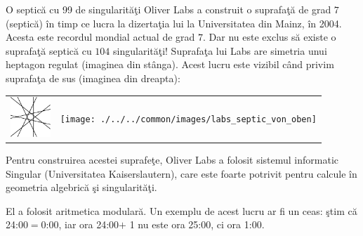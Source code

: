 \begin{surferPage}{O septic\u{a} cu 99 de singularit\u{a}\c{t}i}
     Oliver Labs a construit o suprafa\c{t}\u{a} de grad $7$ (septic\u{a}) \^{i}n timp ce lucra la
    dizerta\c{t}ia lui la Universitatea din Mainz, \^{i}n 2004. Acesta este recordul mondial actual
    de grad $7$. Dar nu este exclus s\u{a} existe o suprafa\c{t}\u{a} septic\u{a} cu $104$ singularit\u{a}\c{t}i!
    Suprafa\c{t}a lui Labs are simetria unui heptagon regulat (imaginea din st\^{a}nga).
    Acest lucru este vizibil c\^{a}nd privim suprafa\c{t}a de sus (imaginea din dreapta):

    \vspace*{-0.3em}
    \begin{center}
      \begin{tabular}{c@{\qquad}c}
        \includegraphics[height=1.5cm]{./../../common/images/labsseptic1.pdf}
        &
        \texttt{[image: ./../../common/images/labs\_septic\_von\_oben]}
      \end{tabular}
    \end{center}
    \vspace*{-0.3em}

    Pentru construirea acestei suprafe\c{t}e, Oliver Labs a folosit sistemul informatic
    {\sc Singular} (Universitatea Kaiserslautern), care este foarte potrivit pentru
    calcule \^{i}n geometria algebric\u{a} \c{s}i singularit\u{a}\c{t}i.

    El a folosit aritmetica modular\u{a}. Un exemplu de acest lucru ar fi un ceas: \c{s}tim c\u{a} 24:00$=$0:00,
    iar ora 24:00$+$ 1 nu este ora 25:00, ci ora 1:00.
\end{surferPage}
